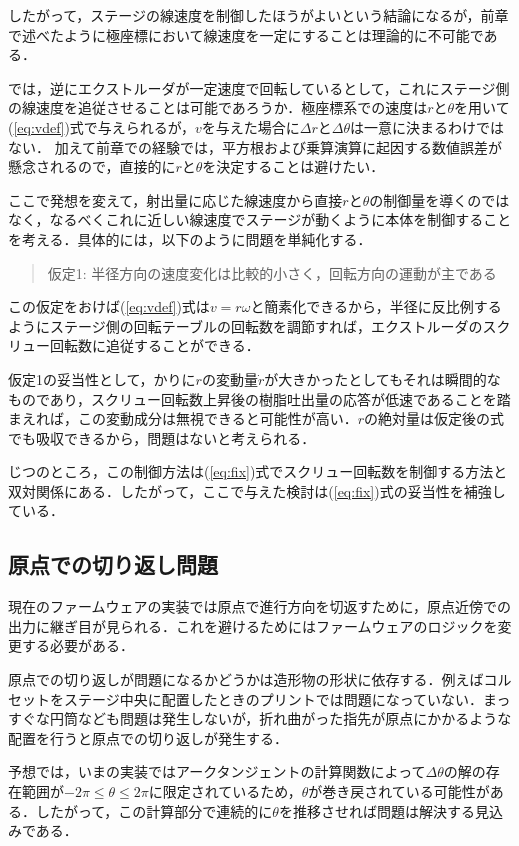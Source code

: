 \documentclass[twocolumn,oneside,a4paper]{article}
\begin{document}
したがって，ステージの線速度を制御したほうがよいという結論になるが，前章で述べたように極座標において線速度を一定にすることは理論的に不可能である．

では，逆にエクストルーダが一定速度で回転しているとして，これにステージ側の線速度を追従させることは可能であろうか．極座標系での速度は$r$と$\theta$を用いて(\ref{eq:vdef})式で与えられるが，$v$を与えた場合に$\Delta r$と$\Delta \theta$は一意に決まるわけではない．
加えて前章での経験では，平方根および乗算演算に起因する数値誤差が懸念されるので，直接的に$r$と$\theta$を決定することは避けたい．

ここで発想を変えて，射出量に応じた線速度から直接$r$と$\theta$の制御量を導くのではなく，なるべくこれに近しい線速度でステージが動くように本体を制御することを考える．具体的には，以下のように問題を単純化する．

\begin{quote}
     仮定1: 半径方向の速度変化は比較的小さく，回転方向の運動が主である
\end{quote}

この仮定をおけば(\ref{eq:vdef})式は$v=r \omega$と簡素化できるから，半径に反比例するようにステージ側の回転テーブルの回転数を調節すれば，エクストルーダのスクリュー回転数に追従することができる．

仮定1の妥当性として，かりに$r$の変動量$\dot{r}$が大きかったとしてもそれは瞬間的なものであり，スクリュー回転数上昇後の樹脂吐出量の応答が低速であることを踏まえれば，この変動成分は無視できると可能性が高い．$r$の絶対量は仮定後の式でも吸収できるから，問題はないと考えられる．

じつのところ，この制御方法は(\ref{eq:fix})式でスクリュー回転数を制御する方法と双対関係にある．したがって，ここで与えた検討は(\ref{eq:fix})式の妥当性を補強している．


\subsection{原点での切り返し問題}
現在のファームウェアの実装では原点で進行方向を切返すために，原点近傍での出力に継ぎ目が見られる．これを避けるためにはファームウェアのロジックを変更する必要がある．

原点での切り返しが問題になるかどうかは造形物の形状に依存する．例えばコルセットをステージ中央に配置したときのプリントでは問題になっていない．まっすぐな円筒なども問題は発生しないが，折れ曲がった指先が原点にかかるような配置を行うと原点での切り返しが発生する．

予想では，いまの実装ではアークタンジェントの計算関数によって$\Delta \theta$の解の存在範囲が$-2 \pi \leq \theta \leq  2 \pi$に限定されているため，$\theta$が巻き戻されている可能性がある．したがって，この計算部分で連続的に$\theta$を推移させれば問題は解決する見込みである．
\end{document}
